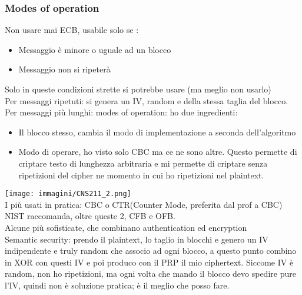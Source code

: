 \documentclass[16px]{article}
\begin{document}
\subsubsection{Modes of operation}
Non usare mai ECB, usabile solo se :
\begin{itemize}
\item Messaggio è minore o uguale ad un blocco
\item Messaggio non si ripeterà
\end{itemize}
Solo in queste condizioni strette si potrebbe usare (ma meglio non usarlo)\\ Per messaggi ripetuti: si genera un IV, random e della stessa taglia del blocco.\\ Per messaggi più lunghi: modes of operation: ho due ingredienti:
\begin{itemize}
\item Il blocco stesso, cambia il modo di implementazione a seconda dell'algoritmo
\item Modo di operare, ho visto solo CBC ma ce ne sono altre. Questo permette di criptare testo di lunghezza arbitraria e mi permette di criptare senza ripetizioni del cipher ne momento in cui ho ripetizioni nel plaintext.
\end{itemize}
\texttt{[image: immagini/CNS211\_2.png]}\\
I più usati in pratica: CBC o CTR(Counter Mode, preferita dal prof a CBC)\\ NIST raccomanda, oltre queste 2, CFB e OFB.\\ Alcune più sofisticate, che combinano authentication ed encryption\\ Semantic security: prendo il plaintext, lo taglio in blocchi e genero un IV indipendente e truly random che associo ad ogni blocco, a questo punto combino in XOR con questi IV e poi produco con il PRP il mio ciphertext. Siccome IV è random, non ho ripetizioni, ma ogni volta che mando il blocco devo spedire pure l'IV, quindi non è soluzione pratica; è il meglio che posso fare.
\end{document}
